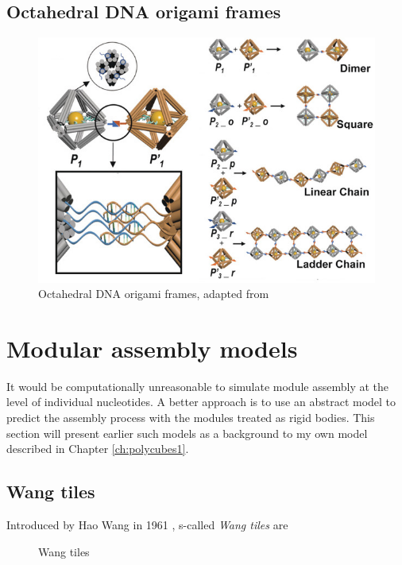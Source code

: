 \subsection{Octahedral DNA origami frames}

\begin{figure}[h]
  \centering\includegraphics[width=\textwidth]{figures/tian.jpg}
  \caption{Octahedral DNA origami frames, adapted from \cite{tian_octahedra2020}}
\end{figure}




\section{Modular assembly models}
It would be computationally unreasonable to simulate module assembly at the level of individual nucleotides. A better approach is to use an abstract model to predict the assembly process with the modules treated as rigid bodies. This section will present earlier such models as a background to my own model described in Chapter \ref{ch:polycubes1}.

\subsection{Wang tiles}
Introduced by Hao Wang in 1961 \cite{wang1961proving}, s-called \emph{Wang tiles} are 

\begin{figure}[h]
  \centering
  \caption{Wang tiles}
\end{figure}

